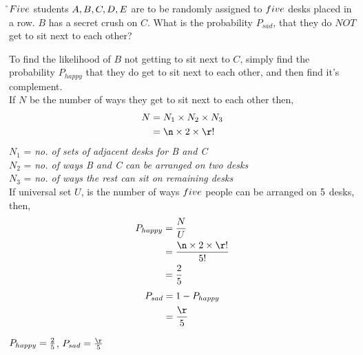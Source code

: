 

\SUBTRACT{}\n
\SUBTRACT{}\r

\question[3] $Five$ students ${A, B, C, D, E}$ are to be randomly assigned to 
$five$ desks placed in a row. $B$ has a secret crush on $C$. 
What is the probability $P_{sad}$, that they do $NOT$ get to sit 
next to each other?


\watchout

\begin{solution}[\halfpage]
  To find the likelihood of $B$ not getting to sit next to $C$, simply
  find the probability $P_{happy}$ that they do get to sit next to each 
  other, and then find it's complement.\\
  If $N$ be the number of ways they get to sit next to each other then, 
  \begin{align}
    N &= N_1\times N_2\times N_3 \\
      &= \n\times 2\times \r! 
  \end{align}
  $N_1$ = \textit{{no. of sets of adjacent desks for B and C}} \\
  $N_2$ = \textit{{no. of ways B and C can be arranged on two desks}} \\
  $N_3$ = \textit{{no. of ways the rest can sit on remaining desks}} \\
  
  If universal set $U$, is the number of ways $five$ people can be 
  arranged on $5$ desks, then,
  \begin{align}
    P_{happy} &= \dfrac{N}{U} \\
              &= \dfrac{\n\times 2\times \r!}{\vd!} \\
              &= \dfrac{2}{\vd}
  \end{align}
  \begin{align}
    P_{sad} &= 1 - P_{happy} \\
            &= \dfrac{\r}{\vd}
  \end{align}
  
\end{solution}

\ifprintanswers\begin{codex}
  $P_{happy} = \frac{2}{5}$, $P_{sad} = \frac{\r}{\vd}$
\end{codex}\fi
